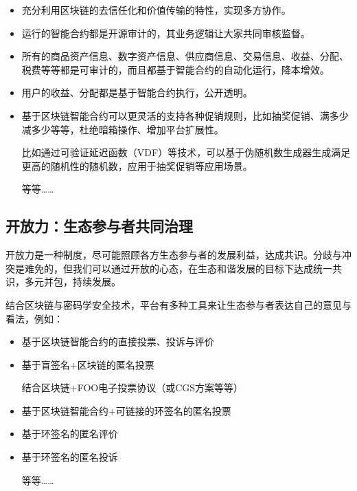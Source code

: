 \documentclass[UTF9]{ctexart}
\begin{document}
\begin{itemize}
\item 充分利用区块链的去信任化和价值传输的特性，实现多方协作。

\item 运行的智能合约都是开源审计的，其业务逻辑让大家共同审核监督。

\item 所有的商品资产信息、数字资产信息、供应商信息、交易信息、收益、分配、税费等等都是可审计的，而且都基于智能合约的自动化运行，降本增效。

\item 用户的收益、分配都是基于智能合约执行，公开透明。

\item 基于区块链智能合约可以更灵活的支持各种促销规则，比如抽奖促销、满多少减多少等等，杜绝暗箱操作、增加平台扩展性。

比如通过可验证延迟函数（VDF）等技术，可以基于伪随机数生成器生成满足更高的随机性的随机数，应用于抽奖促销等应用场景。

等等……

\end{itemize}


\subsection{开放力：生态参与者共同治理}

开放力是一种制度，尽可能照顾各方生态参与者的发展利益，达成共识。分歧与冲突是难免的，但我们可以通过开放的心态，在生态和谐发展的目标下达成统一共识，多元并包，持续发展。

结合区块链与密码学安全技术，平台有多种工具来让生态参与者表达自己的意见与看法，例如：

\begin{itemize}
\item 基于区块链智能合约的直接投票、投诉与评价

\item 基于盲签名+区块链的匿名投票

结合区块链+FOO电子投票协议（或CGS方案等等）

\item 基于区块链智能合约+可链接的环签名的匿名投票

\item 基于环签名的匿名评价

\item 基于环签名的匿名投诉

等等……
\end{itemize}
\end{document}
